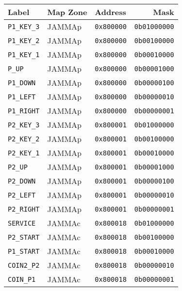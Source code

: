  \begin{figure}[H]
\begin{tabularx}{\textwidth}{Xllr}
  \toprule    
  \textbf{Label } & \textbf{ Map Zone }  & \textbf{Address } & \textbf{Mask } \\               
  \toprule   
  
    \texttt{P1\_KEY\_3} & JAMMAp &    \texttt{0x800000} &  \texttt{0b01000000}    \\ 
      \texttt{P1\_KEY\_2} & JAMMAp &  \texttt{0x800000} &  \texttt{0b00100000}    \\  	
    \texttt{P1\_KEY\_1} & JAMMAp &    \texttt{0x800000} &  \texttt{0b00010000}    \\     
  \texttt{P\_UP}    & JAMMAp &        \texttt{0x800000} &  \texttt{0b00001000}    \\     
  \texttt{P1\_DOWN} & JAMMAp &  \texttt{0x800000} &  \texttt{0b00000100}    \\     
  \texttt{P1\_LEFT} & JAMMAp &  \texttt{0x800000} &  \texttt{0b00000010}    \\     
  \texttt{P1\_RIGHT} & JAMMAp &  \texttt{0x800000} &  \texttt{0b00000001}    \\     
 
  \toprule   
    \texttt{P2\_KEY\_3} & JAMMAp &  \texttt{0x800001}    &  \texttt{0b01000000}    \\     
  \texttt{P2\_KEY\_2} & JAMMAp &  \texttt{0x800001}    &    \texttt{0b00100000}    \\     
  \texttt{P2\_KEY\_1} & JAMMAp &  \texttt{0x800001}    &    \texttt{0b00010000}    \\    
  \texttt{P2\_UP}    & JAMMAp &  \texttt{0x800001}    &     \texttt{0b00001000}    \\     
  \texttt{P2\_DOWN} & JAMMAp &  \texttt{0x800001}    &      \texttt{0b00000100}    \\     
  \texttt{P2\_LEFT} & JAMMAp &  \texttt{0x800001}    &      \texttt{0b00000010}    \\     
  \texttt{P2\_RIGHT} & JAMMAp &  \texttt{0x800001}    &     \texttt{0b00000001}    \\     

  \toprule   
  \texttt{SERVICE} & JAMMAc &  \texttt{0x800018}       &     \texttt{0b01000000}    \\ 
   \texttt{P2\_START} & JAMMAc &  \texttt{0x800018}   &      \texttt{0b00100000}    \\ 
   \texttt{P1\_START} & JAMMAc &  \texttt{0x800018}   &      \texttt{0b00010000}    \\   
     \texttt{COIN2\_P2} & JAMMAc &  \texttt{0x800018}    &   \texttt{0b00000010}    \\  
   \texttt{COIN\_P1} & JAMMAc &  \texttt{0x800018}       &   \texttt{0b00000001}    \\      
     


\end{tabularx}
\end{figure}
